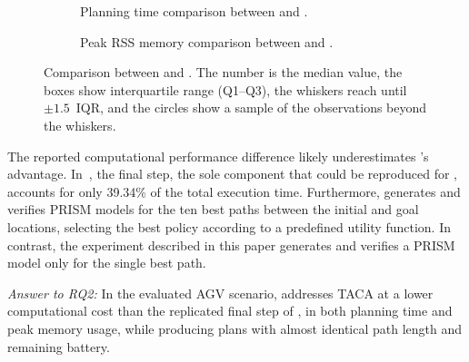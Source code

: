 \begin{figure}[tbp]
    \centering
    \hfill
    \begin{subfigure}[t]{0.45\linewidth}
        \centering
        
        \caption{Planning time comparison between \planta and \CamaraApproach.}%
        \label{planta:fig:time_comparison}
    \end{subfigure}
    \hfill
    \begin{subfigure}[t]{0.45\linewidth}
        \centering
        
        \captionsetup{justification=raggedright}%
        \caption{Peak RSS memory comparison between \planta and \CamaraApproach.}%
        \label{planta:fig:memory_comparison}
    \end{subfigure}
    \hfill
    \caption{Comparison between \planta and \CamaraApproach. The number is the median value, the boxes show interquartile range (Q1--Q3), the whiskers reach until $\pm 1.5$~IQR, and the circles show a sample of the observations beyond the whiskers.}%
    \label{planta:fig:camara_pddl_sas}
\end{figure}

The reported computational performance difference likely underestimates \planta's advantage. In~\cite{CAMARASoftwareArchitectureTask2020}, the final step, the sole component that could be reproduced for \CamaraApproach, accounts for only 39.34\% of the total execution time. Furthermore, \CamaraApproach generates and verifies PRISM models for the ten best paths between the initial and goal locations, selecting the best policy according to a predefined utility function. In contrast, the experiment described in this paper generates and verifies a PRISM model only for the single best path.

\emph{Answer to RQ2:} In the evaluated AGV scenario, \planta addresses TACA at a lower computational cost than the replicated final step of \CamaraApproach, in both planning time and peak memory usage, while producing plans with almost identical path length and remaining battery.

